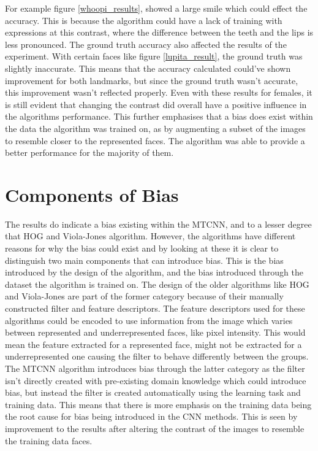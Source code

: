 \documentclass{l4proj}
\begin{document}
For example figure \ref{whoopi_results}, showed a large smile which could effect the accuracy. This is because the algorithm could have a lack of training with expressions at this contrast, where the difference between the teeth and the lips is less pronounced. The ground truth accuracy also affected the results of the experiment. With certain faces like figure \ref{lupita_result}, the ground truth was slightly inaccurate. This means that the accuracy calculated could've shown improvement for both landmarks, but since the ground truth wasn't accurate, this improvement wasn't reflected properly. Even with these results for females, it is still evident that changing the contrast did overall have a positive influence in the algorithms performance. This further emphasises that a bias does exist within the data the algorithm was trained on, as by augmenting a subset of the images to resemble closer to the represented faces. The algorithm was able to provide a better performance for the majority of them.
\section{Components of Bias}
The results do indicate a bias existing within the MTCNN, and to a lesser degree that HOG and Viola-Jones algorithm. However, the algorithms have different reasons for why the bias could exist and by looking at these it is clear to distinguish two main components that can introduce bias. This is the bias introduced by the design of the algorithm, and the bias introduced through the dataset the algorithm is trained on. The design of the older algorithms like HOG and Viola-Jones are part of the former category because of their manually constructed filter and feature descriptors. The feature descriptors used for these algorithms could be encoded to use information from the image which varies between represented and underrepresented faces, like pixel intensity. This would mean the feature extracted for a represented face, might not be extracted for a underrepresented one causing the filter to behave differently between the groups. The MTCNN algorithm introduces bias through the latter category as the filter isn't directly created with pre-existing domain knowledge which could introduce bias, but instead the filter is created automatically using the learning task and training data. This means that there is more emphasis on the training data being the root cause for bias being introduced in the CNN methods. This is seen by improvement to the results after altering the contrast of the images to resemble the training data faces.
\end{document}
